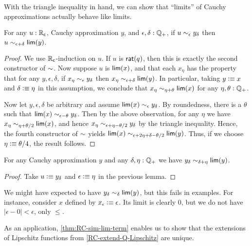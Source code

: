 With the triangle inequality in hand, we can show that ``limits'' of Cauchy approximations actually behave like limits.

\begin{lem}\label{thm:RC-sim-lim}
  For any $u:\mathbb{R}_\mathsf{c}$, Cauchy approximation $y$, and $\epsilon,\delta:\mathbb{Q}_{+}$, if $u\sim_{\epsilon} y_\delta$ then $u\sim_{\epsilon+\delta} \mathsf{lim}(y)$.
\end{lem}
\begin{proof}
  We use $\mathbb{R}_\mathsf{c}$-induction on $u$.
  If $u$ is $\mathsf{rat}(q)$, then this is exactly the second constructor of $\mathord\sim$.
  Now suppose $u$ is $\mathsf{lim}(x)$, and that each $x_\eta$ has the property that for any $y,\epsilon,\delta$, if $x_\eta\sim_{\epsilon} y_\delta$ then $x_\eta \sim_{\epsilon+\delta} \mathsf{lim}(y)$.
  In particular, taking $y\vcentcolon\equiv x$ and $\delta\vcentcolon\equiv\eta$ in this assumption, we conclude that $x_\eta \sim_{\eta+\theta} \mathsf{lim}(x)$ for any $\eta,\theta:\mathbb{Q}_{+}$.

  Now let $y,\epsilon,\delta$ be arbitrary and assume $\mathsf{lim}(x) \sim_{\epsilon} y_\delta$.
  By roundedness, there is a $\theta$ such that $\mathsf{lim}(x) \sim_{\epsilon-\theta} y_\delta$.
  Then by the above observation, for any $\eta$ we have $x_\eta \sim_{\eta+\theta/2} \mathsf{lim}(x)$, and hence $x_\eta \sim_{\epsilon+\eta-\theta/2} y_\delta$ by the triangle inequality.
  Hence, the fourth constructor of $\mathord\sim$ yields $\mathsf{lim}(x) \sim_{\epsilon+2\eta+\delta-\theta/2} \mathsf{lim}(y)$.
  Thus, if we choose $\eta \vcentcolon\equiv \theta/4$, the result follows.
\end{proof}

\begin{lem}\label{thm:RC-sim-lim-term}
  For any Cauchy approximation $y$ and any $\delta,\eta:\mathbb{Q}_{+}$ we have $y_\delta \sim_{\delta+\eta} \mathsf{lim}(y)$.
\end{lem}
\begin{proof}
  Take $u\vcentcolon\equiv y_\delta$ and $\epsilon\vcentcolon\equiv \eta$ in the previous lemma.
\end{proof}

\begin{rmk}
  We might have expected to have $y_\delta \sim_{\delta} \mathsf{lim}(y)$, but this fails in examples.
  For instance, consider $x$ defined by $x_\epsilon \vcentcolon\equiv \epsilon$.
  Its limit is clearly $0$, but we do not have $|\epsilon - 0 |<\epsilon$, only $\le$.
\end{rmk}

As an application, \cref{thm:RC-sim-lim-term} enables us to show that the extensions of Lipschitz functions from \cref{RC-extend-Q-Lipschitz} are unique.

